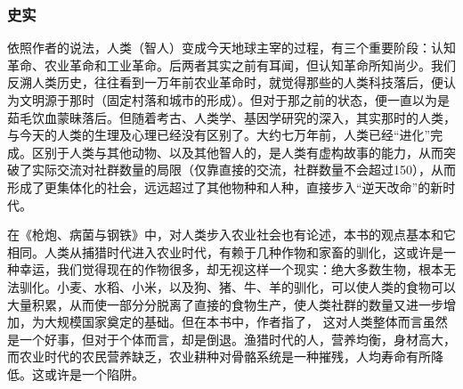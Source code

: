 \subsubsection{史实}
依照作者的说法，人类（智人）变成今天地球主宰的过程，有三个重要阶段：认知革命、农业革命和工业革命。后两者其实之前有耳闻，但认知革命所知尚少。我们反溯人类历史，往往看到一万年前农业革命时，就觉得那些的人类科技落后，便认为文明源于那时（固定村落和城市的形成）。但对于那之前的状态，便一直以为是茹毛饮血蒙昧落后。但随着考古、人类学、基因学研究的深入，其实那时的人类，与今天的人类的生理及心理已经没有区别了。大约七万年前，人类已经“进化”完成。区别于人类与其他动物、以及其他智人的，是人类有虚构故事的能力，从而突破了实际交流对社群数量的局限（仅靠直接的交流，社群数量不会超过150），从而形成了更集体化的社会，远远超过了其他物种和人种，直接步入“逆天改命”的新时代。

在《枪炮、病菌与钢铁》中，对人类步入农业社会也有论述，本书的观点基本和它相同。人类从捕猎时代进入农业时代，有赖于几种作物和家畜的驯化，这或许是一种幸运，我们觉得现在的作物很多，却无视这样一个现实：绝大多数生物，根本无法驯化。小麦、水稻、小米，以及狗、猪、牛、羊的驯化，可以使人类的食物可以大量积累，从而使一部分分脱离了直接的食物生产，使人类社群的数量又进一步增加，为大规模国家奠定的基础。但在本书中，作者指了， 这对人类整体而言虽然是一个好事，但对于个体而言，却是倒退。渔猎时代的人，营养均衡，身材高大，而农业时代的农民营养缺乏，农业耕种对骨骼系统是一种摧残，人均寿命有所降低。这或许是一个陷阱。
